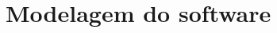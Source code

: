 \documentclass[../../layout.tex]{subfiles}
\begin{document}
\chapter{Modelagem do software}
\blindtext
\end{document}
